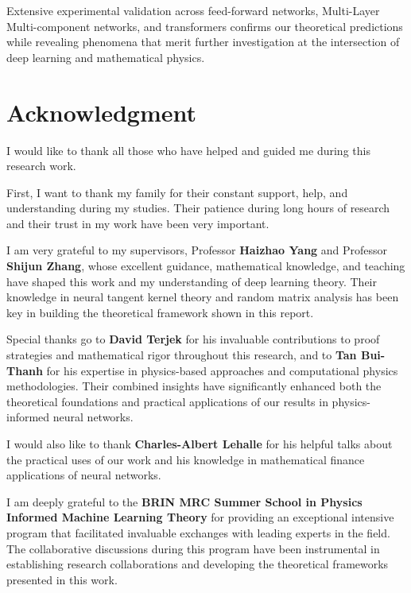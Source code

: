 \documentclass[a4paper]{article}
\theoremstyle{plain}
\theoremstyle{definition}
\theoremstyle{remark}
\begin{document}
Extensive experimental validation across feed-forward networks, Multi-Layer Multi-component networks, and transformers confirms our theoretical predictions while revealing phenomena that merit further investigation at the intersection of deep learning and mathematical physics.

\newpage



\section*{Acknowledgment}

I would like to thank all those who have helped and guided me during this research work.

First, I want to thank my family for their constant support, help, and understanding during my studies. Their patience during long hours of research and their trust in my work have been very important.

I am very grateful to my supervisors, Professor \textbf{Haizhao Yang} and Professor \textbf{Shijun Zhang}, whose excellent guidance, mathematical knowledge, and teaching have shaped this work and my understanding of deep learning theory. Their knowledge in neural tangent kernel theory and random matrix analysis has been key in building the theoretical framework shown in this report.

Special thanks go to \textbf{David Terjek} for his invaluable contributions to proof strategies and mathematical rigor throughout this research, and to \textbf{Tan Bui-Thanh} for his expertise in physics-based approaches and computational physics methodologies. Their combined insights have significantly enhanced both the theoretical foundations and practical applications of our results in physics-informed neural networks.

I would also like to thank \textbf{Charles-Albert Lehalle} for his helpful talks about the practical uses of our work and his knowledge in mathematical finance applications of neural networks.

I am deeply grateful to the \textbf{BRIN MRC Summer School in Physics Informed Machine Learning Theory} for providing an exceptional intensive program that facilitated invaluable exchanges with leading experts in the field. The collaborative discussions during this program have been instrumental in establishing research collaborations and developing the theoretical frameworks presented in this work.
\end{document}

